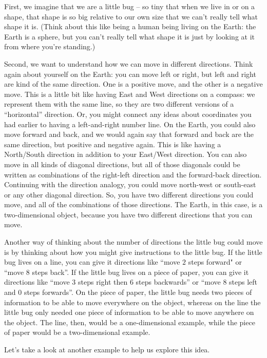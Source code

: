 \documentclass{ximera}
\begin{document}
First, we imagine that we are a little bug -- so tiny that when we live in or on a shape, that shape is so big relative to our own size that we can't really tell what shape it is. (Think about this like being a human being living on the Earth: the Earth is a sphere, but you can't really tell what shape it is just by looking at it from where you're standing.)

Second, we want to understand how we can move in different directions. Think again about yourself on the Earth: you can move left or right, but left and right are kind of the same direction. One is a positive move, and the other is a negative move. This is a little bit like having East and West directions on a compass: we represent them with the same line, so they are two different versions of a ``horizontal'' direction. Or, you might connect any ideas about coordinates you had earlier to having a left-and-right number line. On the Earth, you could also move forward and back, and we would again say that forward and back are the same direction, but positive and negative again. This is like having a North/South direction in addition to your East/West direction. You can also move in all kinds of diagonal directions, but all of those diagonals could be written as combinations of the right-left direction and the forward-back direction. Continuing with the direction analogy, you could move north-west or south-east or any other diagonal direction. So, you have two different directions you could move, and all of the combinations of those directions. The Earth, in this case, is a two-dimensional object, because you have two different directions that you can move.

Another way of thinking about the number of directions the little bug could move is by thinking about how you might give instructions to the little bug. If the little bug lives on a line, you can give it directions like ``move $2$ steps forward" or ``move 8 steps back''. If the little bug lives on a piece of paper, you can give it directions like ``move $3$ steps right then $6$ steps backwards'' or ``move $8$ steps left and $0$ steps forwards''. On the piece of paper, the little bug needs two pieces of information to be able to move everywhere on the object, whereas on the line the little bug only needed one piece of information to be able to move anywhere on the object. The line, then, would be a one-dimensional example, while the piece of paper would be a two-dimensional example.


Let's take a look at another example to help us explore this idea.
\end{document}
